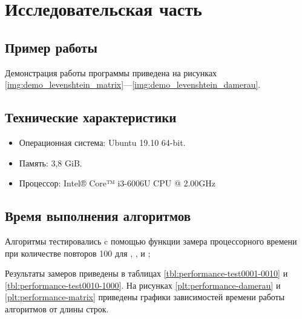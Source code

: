 \chapter{Исследовательская часть}

\section{Пример работы}

Демонстрация работы программы приведена на рисунках \ref{img:demo_levenshtein_matrix}---\ref{img:demo_levenshtein_damerau}.


\section{Технические характеристики}

\begin{itemize}
	\item Операционная система: Ubuntu 19.10 64-bit.
	\item Память: 3,8 GiB.
	\item Процессор: Intel® Core™ i3-6006U CPU @ 2.00GHz
\end{itemize}

\section{Время выполнения алгоритмов}

Алгоритмы тестировались c помощью функции замера процессорного времени  при количестве повторов 100 для \hyperref[lst:levenshtein_matrix]{}, \hyperref[lst:levenshtein_damerau_matrix]{}, и \hyperref[lst:levenshtein_damerau_recursive]{};

Результаты замеров приведены в таблицах \ref{tbl:performance-test0001-0010} и \ref{tbl:performance-test0010-1000}.
На рисунках \ref{plt:performance-damerau} и \ref{plt:performance-matrix} приведены графики зависимостей времени работы алгоритмов от длины строк.

